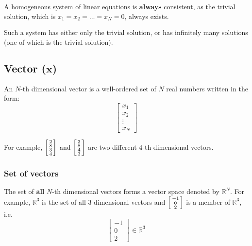 \documentclass[11pt]{article}
\begin{document}
A homogeneous system of linear equations is \textbf{always} consistent, as the trivial solution, which is \(x_1 = x_2 = \ldots = x_N = 0\), always exists.

Such a system has either only the trivial solution, or has infinitely many solutions (one of which is the trivial solution).

\subsection{Vector (\(\boldsymbol{x}\))}
\label{sec:orge5f65fd}
An \(N\)-th dimensional vector is a well-ordered set of \(N\) real numbers written in the form:
\begin{displaymath}
\begin{bmatrix}
x_1 \\
x_2 \\
\vdots \\
x_N
\end{bmatrix}
\end{displaymath}

For example,
\begin{math}
\begin{bsmallmatrix}
2 \\
8 \\
3 \\
4
\end{bsmallmatrix}
\end{math}
and
\begin{math}
\begin{bsmallmatrix}
2 \\
8 \\
4 \\
3
\end{bsmallmatrix}
\end{math}
are two different 4-th dimensional vectors.

\subsubsection{Set of vectors}
\label{sec:org64ceada}
The set of \textbf{all} \(N\)-th dimensional vectors forms a vector space denoted by \(\mathbb{R}^N\). For example, \(\mathbb{R}^3\) is the set of all 3-dimensional vectors and
\begin{math}
\begin{bsmallmatrix}
-1 \\
0 \\
2
\end{bsmallmatrix}
\end{math}
is a member of \(\mathbb{R}^3\), i.e.
\begin{displaymath}
\begin{bmatrix}
-1 \\
0 \\
2
\end{bmatrix} \in \mathbb{R}^3
\end{displaymath}
\end{document}
